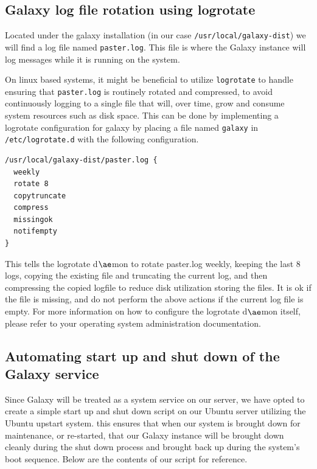 \documentclass[a4paper,10pt]{article}
\begin{document}
\subsection{Galaxy log file rotation using logrotate}
Located under the galaxy installation (in our case \texttt{\footnotesize{/usr/local/galaxy-dist}})  we will find a log file named \texttt{\footnotesize{paster.log}}.  This file is where the Galaxy instance will log messages while it is running on the system.

On linux based systems, it might be beneficial to utilize \texttt{\footnotesize{logrotate}} to handle ensuring that \texttt{\footnotesize{paster.log}} is routinely rotated and compressed, to avoid continuously logging to a single file that will, over time, grow and consume system resources such as disk space.  This can be done by implementing a logrotate configuration for galaxy by placing a file named \texttt{\footnotesize{galaxy}} in \texttt{\footnotesize{/etc/logrotate.d}} with the following configuration.

\begin{lstlisting}
/usr/local/galaxy-dist/paster.log {
  weekly
  rotate 8
  copytruncate
  compress
  missingok
  notifempty
}
\end{lstlisting}

This tells the logrotate d$\ae$mon to rotate paster.log weekly, keeping the last 8 logs, copying the existing file and truncating the current log, and then compressing the copied logfile to reduce disk utilization storing the files.  It is ok if the file is missing, and do not perform the above actions if the current log file is empty.  For more information on how to configure the logrotate d$\ae$mon itself, please refer to your operating system administration documentation.

\subsection{Automating start up and shut down of the Galaxy service}
Since Galaxy will be treated as a system service on our server, we have opted to create a simple start up and shut down script on our Ubuntu server utilizing the Ubuntu upstart system.  this ensures that when our system is brought down for maintenance, or re-started, that our Galaxy instance will be brought down cleanly during the shut down process and brought back up during the system's boot sequence.  Below are the contents of our script for reference.
\pagebreak

\end{document}
